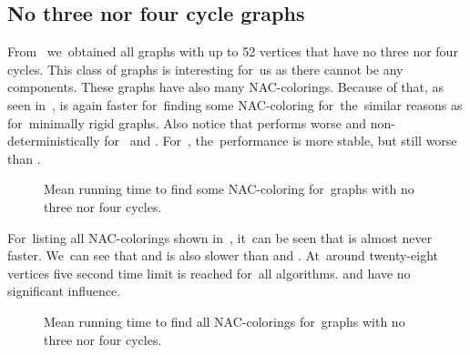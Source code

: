 \subsection*{No three nor four cycle graphs}

From~\cite{extremal_graphs} we~obtained all graphs with up to 52 vertices
that have no three nor four cycles. This class of graphs is interesting for~us
as there cannot be any \trcon{} components.
These graphs have also many NAC-colorings.
Because of that, as seen in~,
\NaiveCycles{} is again faster for~finding some NAC-coloring
for~the~similar reasons as for~minimally rigid graphs.
%
Also notice that \SharedVertices{} performs worse and non-deterministically
for~\CyclesMatchChunks{} and \None{}.
For~\Neighbors{}, the~performance is more stable, but still worse than \MergeLinear{}.

\begin{figure}[thbp]
	\centering
	\scalebox{\BenchFigureScale}{}
	\caption[Mean runtime for~graphs with no 3 nor 4 cycles (some)]{
		Mean running time to find some NAC-coloring for~graphs with no three nor four cycles.}%
	\label{fig:graph_count_no_3_nor_4_cycles_first_runtime}
\end{figure}%

For~listing all NAC-colorings shown
in~,
it~can be seen that \NaiveCycles{} is almost never faster.
We~can see that \None{} and \CyclesMatchChunks{} is also slower than
\Neighbors{} and \NeighborsDegree{}.
At~around twenty-eight vertices five second time limit is reached for~all algorithms.
\MergeLinear{} and \SharedVertices{} have no significant influence.
%
\begin{figure}[thbp]
	\centering
	\scalebox{\BenchFigureScale}{}
	\caption[Mean runtime for~graphs with no 3 nor 4 cycles (all)]{
		Mean running time to find all NAC-colorings for~graphs with no three nor four cycles.}%
	\label{fig:graph_count_no_3_nor_4_cycles_all_runtime}
\end{figure}%


